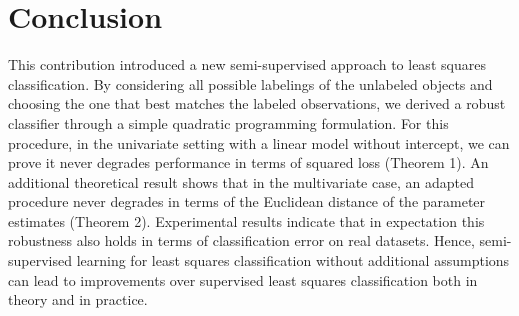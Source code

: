 \documentclass[smallcondensed]{svjour3}
\begin{document}



\section{Conclusion}
This contribution introduced a new semi-supervised approach to least squares classification. By considering all possible labelings of the unlabeled objects and choosing the one that best matches the labeled observations, we derived a robust classifier through a simple quadratic programming formulation. For this procedure, in the univariate setting with a linear model without intercept, we can prove it never degrades performance in terms of squared loss (Theorem 1). An additional theoretical result shows that in the multivariate case, an adapted procedure never degrades in terms of the Euclidean distance of the parameter estimates (Theorem 2). Experimental results indicate that in expectation this robustness also holds in terms of classification error on real datasets. Hence, semi-supervised learning for least squares classification without additional assumptions can lead to improvements over supervised least squares classification both in theory and in practice.
\end{document}
